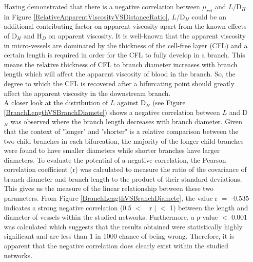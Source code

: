 \noindent Having demonstrated that there is a negative correlation between $\mu_{rel}$ and $L$/D$_{H}$ in Figure \ref{RelativeApparentViscosityVSDistanceRatio}, $L$/D$_{H}$ could be an additional contributing factor on apparent viscosity apart from the known effects of  D$_{H}$ and H$_{D}$ on apparent viscosity. It is well-known that the apparent viscosity in micro-vessels are dominated by the thickness of the cell-free layer (CFL) and a certain length is required in order for the CFL to fully develop in a branch. This means the relative thickness of CFL to branch diameter increases with branch length which will affect the apparent viscosity of blood in the branch. So, the degree to which the CFL is recovered after a bifurcating point should greatly affect the apparent viscosity in the downstream branch. \\

\noindent A closer look at the distribution of $L$ against D$_{H}$ (see Figure \ref{BranchLengthVSBranchDiamete}) shows a negative correlation between $L$ and D$_{H}$ was observed where the branch length decreases with branch diameter. Given that the context of "longer" and "shorter" is a relative comparison between the two child branches in each bifurcation, the majority of the longer child branches were found to have smaller diameters while shorter branches have larger diameters. To evaluate the potential of a negative correlation, the Pearson correlation coefficient (r) was calculated to measure the ratio of the covariance of branch diameter and branch length to the product of their standard deviations. This gives us the measure of the linear relationship between these two parameters. From Figure \ref{BranchLengthVSBranchDiamete}, the value r $=$ -0.535 indicates a strong negative correlation (0.5 $<$ $\lvert$ r $\rvert$ $<$ 1) between the length and diameter of vessels within the studied networks. Furthermore, a p-value $<$ 0.001 was calculated which suggests that the results obtained were statistically highly significant and are less than 1 in 1000 chance of being wrong. Therefore, it is apparent that the negative correlation does clearly exist within the studied networks. 


